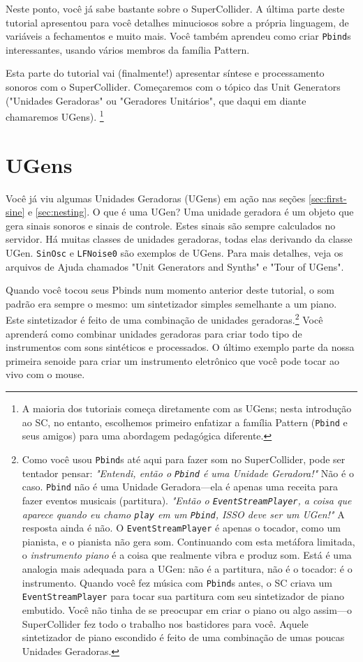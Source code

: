 Neste ponto, você já sabe bastante sobre o SuperCollider. A última parte deste tutorial apresentou para você detalhes minuciosos sobre a própria linguagem, de variáveis a fechamentos e muito mais. Você também aprendeu como criar \texttt{Pbind}s interessantes, usando vários membros da família Pattern.

Esta parte do tutorial vai (finalmente!) apresentar síntese e processamento sonoros com o SuperCollider. Começaremos com o tópico das Unit Generators ("Unidades Geradoras" ou "Geradores Unitários", que daqui em diante chamaremos UGens). \footnote{A maioria dos tutoriais começa diretamente com as UGens; nesta introdução ao SC, no entanto, escolhemos primeiro enfatizar a família Pattern (\texttt{Pbind} e seus amigos) para uma abordagem pedagógica diferente.}

\section{UGens}

Você já viu algumas Unidades Geradoras (UGens) em ação nas seções \ref{sec:first-sine} e \ref{sec:nesting}. O que é uma UGen? Uma unidade geradora é um objeto que gera sinais sonoros e sinais de controle. Estes sinais são sempre calculados no servidor. Há muitas classes de unidades geradoras, todas elas derivando da classe UGen. \texttt{SinOsc} e \texttt{LFNoise0} são exemplos de UGens. Para mais detalhes, veja os arquivos de Ajuda chamados "Unit Generators and Synths" e "Tour of UGens". 

Quando você tocou seus Pbinds num momento anterior deste tutorial, o som padrão era sempre o mesmo: um sintetizador simples semelhante a um piano. Este sintetizador é feito de uma combinação de unidades geradoras.\footnote{Como você usou \texttt{Pbind}s até aqui para fazer som no SuperCollider, pode ser tentador pensar: \textit{"Entendi, então o \texttt{Pbind} é uma Unidade Geradora!"} Não é o caso. \texttt{Pbind} não é uma Unidade Geradora---ela é apenas uma receita para fazer eventos musicais (partitura). \textit{"Então o \texttt{EventStreamPlayer}, a coisa que aparece quando eu chamo \texttt{play} em um \texttt{Pbind}, ISSO deve ser um UGen!"} A resposta ainda é não. O \texttt{EventStreamPlayer} é apenas o tocador, como um pianista, e o pianista não gera som. Continuando com esta metáfora limitada, o \emph{instrumento piano} é a coisa que realmente vibra e produz som. Está é uma analogia mais adequada para a UGen: não é a partitura, não é o tocador: é o instrumento. Quando você fez música com \texttt{Pbind}s antes, o SC criava um \texttt{EventStreamPlayer} para tocar sua partitura com seu sintetizador de piano embutido. Você não tinha de se preocupar em criar o piano ou algo assim---o SuperCollider fez todo o trabalho nos bastidores para você. Aquele sintetizador de piano escondido é feito de uma combinação de umas poucas Unidades Geradoras.} Você aprenderá como combinar unidades geradoras para criar todo tipo de instrumentos com sons sintéticos e processados. O último exemplo parte da nossa primeira senoide para criar um instrumento eletrônico que você pode tocar ao vivo com o mouse.

